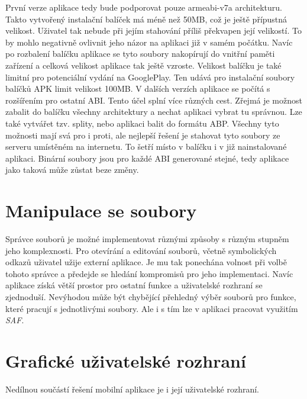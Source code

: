         První verze aplikace tedy bude podporovat pouze armeabi-v7a architekturu. Takto vytvořený instalační balíček má méně než 50MB, což je ještě přípustná velikost. Uživatel tak nebude při jejím stahování příliš překvapen její velikostí. To by mohlo negativně ovlivnit jeho názor na aplikaci již v samém počátku. Navíc po rozbalení balíčku aplikace se tyto soubory nakopírují do vnitřní paměti zařízení a celková velikost aplikace tak ještě vzroste. Velikost balíčku je také limitní pro potenciální vydání na GooglePlay. Ten udává pro instalační soubory balíčků APK limit velikost 100MB.
        V dalších verzích aplikace se počítá s rozšířením pro ostatní ABI. Tento účel splní více různých cest. Zřejmá je možnost zabalit do balíčku všechny architektury a nechat aplikaci vybrat tu správnou. Lze také vytvářet tzv. splity, nebo aplikaci balit do formátu ABP. Všechny tyto možnosti mají svá pro i proti, ale nejlepší řešení je stahovat tyto soubory ze serveru umístěném na internetu. To šetří místo v balíčku i v již nainstalované aplikaci. Binární soubory jsou pro každé ABI generované stejné, tedy aplikace jako taková může zůstat beze změny.

    \section{Manipulace se soubory}
    Správce souborů je možné implementovat různými způsoby s různým stupněm jeho komplexnosti. Pro otevírání a editování souborů, včetně symbolických odkazů uživatel užije externí aplikace. Je mu tak ponechána volnost při volbě tohoto správce a předejde se hledání kompromisů pro jeho implementaci. Navíc aplikace  získá větší prostor pro ostatní funkce a uživatelské rozhraní se zjednoduší. Nevýhodou může být chybějící přehledný výběr souborů pro funkce, které pracují s jednotlivými soubory. Ale i s tím lze v aplikaci pracovat využitím \emph{SAF}.

    \newpage
    \section{Grafické uživatelské rozhraní}
    Nedílnou součástí řešení mobilní aplikace je i její uživatelské rozhraní.
    
